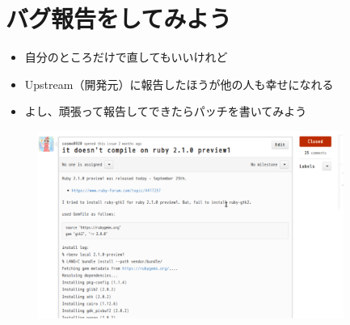 \section{バグ報告をしてみよう}
\begin{frame}
\begin{itemize}
\item 自分のところだけで直してもいいけれど
\item Upstream（開発元）に報告したほうが他の人も幸せになれる
\item よし、頑張って報告してできたらパッチを書いてみよう
\end{itemize}
\end{frame}

\begin{frame}
\begin{figure}
  \includegraphics[width=10cm]{img/issue180.pdf}
\end{figure}
\end{frame}
